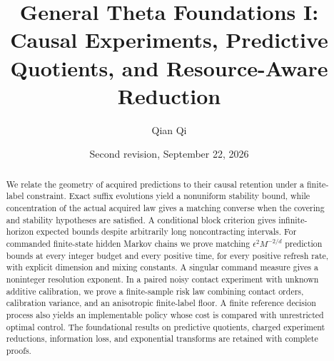 
\title[General Theta Foundations I]{General Theta Foundations I: Causal Experiments, Predictive Quotients, and Resource-Aware Reduction}
\author{Qian Qi}
\date{Second revision, September 22, 2026}

\begin{abstract}
We relate the geometry of acquired predictions to their causal retention
under a finite-label constraint. Exact suffix evolutions yield a
nonuniform stability bound, while concentration of the actual acquired
law gives a matching converse when the covering and stability hypotheses
are satisfied. A conditional block criterion gives infinite-horizon
expected bounds despite arbitrarily long noncontracting intervals.
For commanded finite-state hidden Markov chains we prove matching
$\epsilon^2M^{-2/d}$ prediction bounds at every integer budget and every
positive time, for every positive refresh rate, with explicit dimension
and mixing constants. A singular command measure gives a noninteger
resolution exponent. In a paired noisy contact experiment with unknown
additive calibration, we prove a finite-sample risk law combining contact
orders, calibration variance, and an anisotropic finite-label floor.
A finite reference decision process also yields an implementable policy
whose cost is compared with unrestricted optimal control. The foundational
results on predictive quotients, charged experiment reductions, information
loss, and exponential transforms are retained with complete proofs.
\end{abstract}
\maketitle
\tableofcontents

\appendix
